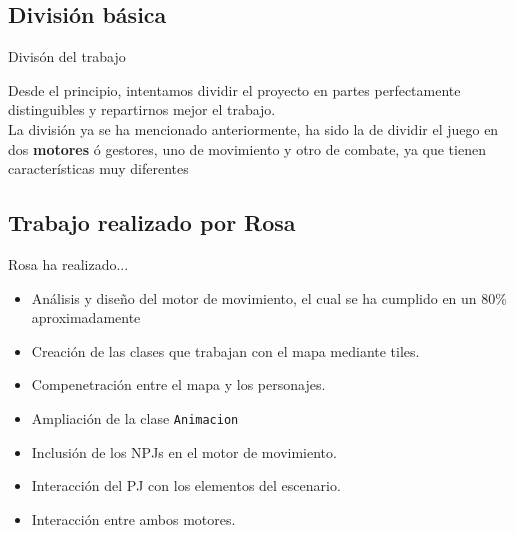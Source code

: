 \documentclass[9pt,xcolor=svgnames]{beamer}
\begin{document}
 \subsection{División básica}
 \begin{frame}{Divisón del trabajo}
   \transdissolve
   
   Desde el principio, intentamos dividir el proyecto en partes perfectamente
   distinguibles y repartirnos mejor el trabajo.\\

   La división ya se ha mencionado anteriormente, ha sido la de dividir el
   juego en dos \textbf{motores} ó gestores, uno de movimiento y otro de
   combate, ya que tienen características muy diferentes\\
 \end{frame}

\subsection{Trabajo realizado por Rosa}
\begin{frame}{Rosa ha realizado...}
  \transdissolve
  
  \begin{itemize}
  \item Análisis y diseño del motor de movimiento, el cual se ha cumplido
    en un 80\% aproximadamente
  \item Creación de las clases que trabajan con el mapa mediante tiles.
  \item Compenetración entre el mapa y los personajes.
  \item Ampliación de la clase \texttt{Animacion}
  \item Inclusión de los NPJs en el motor de movimiento.
  \item Interacción del PJ con los elementos del escenario.
  \item Interacción entre ambos motores.
  \end{itemize}
\end{frame}
\end{document}

